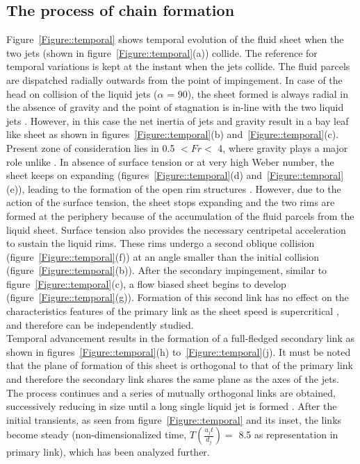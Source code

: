\subsection{The process of chain formation}
Figure~\ref{Figure::temporal} shows temporal evolution of the fluid sheet when the two jets (shown in figure~\ref{Figure::temporal}(a)) collide. The reference for temporal variations is kept at the instant when the jets collide. The fluid parcels are dispatched radially outwards from the point of impingement. In case of the head on collision of the liquid jets ($\alpha$ = 90\degree), the sheet formed is always radial in the absence of gravity \citep{eggers2008physics} and the point of stagnation is in-line with the two liquid jets \citep{inamura2014effect}. However, in this case the net inertia of jets and gravity result in a bay leaf like sheet as shown in figures~\ref{Figure::temporal}(b) and~\ref{Figure::temporal}(c). Present zone of consideration lies in 0.5 $< Fr <$ 4, where gravity plays a major role unlike \cite{bush2004collision,bremond2006atomization}. In absence of surface tension or at very high Weber number, the sheet keeps on expanding (figures~\ref{Figure::temporal}(d) and~\ref{Figure::temporal}(e)), leading to the formation of the open rim structures \citep{taylor1960formation,chen2013high}. However, due to the action of the surface tension, the sheet stops expanding and the two rims are formed at the periphery because of the accumulation of the fluid parcels from the liquid sheet. Surface tension also provides the necessary centripetal acceleration to sustain the liquid rims. These rims undergo a second oblique collision (figure~\ref{Figure::temporal}(f)) at an angle smaller than the initial collision (figure~\ref{Figure::temporal}(b)). After the secondary impingement, similar to figure~\ref{Figure::temporal}(c), a flow biased sheet begins to develop (figure~\ref{Figure::temporal}(g)). Formation of this second link has no effect on the characteristics features of the primary link as the sheet speed is supercritical \citep{bush2004collision}, and therefore can be independently studied.\\
Temporal advancement results in the formation of a full-fledged secondary link as shown in figures~\ref{Figure::temporal}(h) to~\ref{Figure::temporal}(j). It must be noted that the plane of formation of this sheet is orthogonal to that of the primary link and therefore the secondary link shares the same plane as the axes of the jets. The process continues and a series of mutually orthogonal links are obtained, successively reducing in size until a long single liquid jet is formed \citep{bush2004collision}. After the initial transients, as seen from figure~\ref{Figure::temporal} and its inset, the links become steady (non-dimensionalized time, $T \left(\frac{u_jt}{d_j}\right) = $ 8.5 as representation in primary link), which has been analyzed further.
